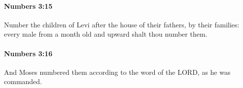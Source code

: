 		\paragraph{Numbers 3:15} %
			\label{NUMBERS-3-15}

			Number the children of Levi after the house of their fathers, by their families: every male from a month old and upward shalt thou number them.


		\paragraph{Numbers 3:16} %
			\label{NUMBERS-3-16}

			And Moses numbered them according to the word of the LORD, as he was commanded.


